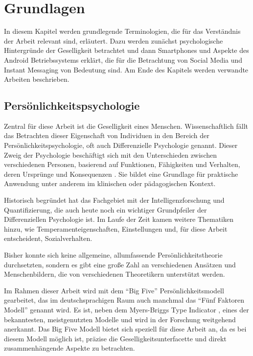 
\chapter{Grundlagen}
\label{ch:Grundlagen}

In diesem Kapitel werden grundlegende Terminologien, die für das Verständnis der Arbeit relevant sind, erläutert.
Dazu werden zunächst psychologische Hintergründe der Geselligkeit betrachtet und
dann Smartphones und Aspekte des Android Betriebssystems erklärt, die für die Betrachtung von Social Media und Instant Messaging von Bedeutung sind.
Am Ende des Kapitels werden verwandte Arbeiten beschrieben.

\section{Persönlichkeitspsychologie}
\label{ch:Grundlagen:sec:Abschnitt1}

Zentral für diese Arbeit ist die Geselligkeit eines Menschen.
Wissenschaftlich fällt das Betrachten dieser Eigenschaft von Individuen in den Bereich der Persönlichkeitspsychologie,
oft auch Differenzielle Psychologie genannt. 
Dieser Zweig der Psychologie beschäftigt sich mit den Unterschieden zwischen verschiedenen Personen, 
basierend auf Funktionen, Fähigkeiten und Verhalten, deren Ursprünge und Konsequenzen \cite{amelang2006differentielle}.
Sie bildet eine Grundlage für praktische Anwendung unter anderem im klinischen oder pädagogischen Kontext.
\par

Historisch begründet hat das Fachgebiet mit der Intelligenzforschung und Quantifizierung, 
die auch heute noch ein wichtiger Grundpfeiler der Differenziellen Psychologie ist.
Im Laufe der Zeit kamen weitere Thematiken hinzu, wie Temperamenteigenschaften, Einstellungen und, für diese Arbeit entscheident, Sozialverhalten.
\par

Bisher konnte sich keine allgemeine, allumfassende Persönlichkeitstheorie durchsetzten, sondern es gibt eine große Zahl an verschiedenen Ansätzen und Menschenbildern, die von verschiedenen Theoretikern unterstützt werden.
Im Rahmen dieser Arbeit wird mit dem "`Big Five"' Persönlichkeitsmodell gearbeitet, das im deutschsprachigen Raum auch manchmal das "`Fünf Faktoren Modell"' genannt wird.
Es ist, neben dem Myers-Briggs Type Indicator \cite{briggs1980gifts}, eines der bekanntesten, meistgenutzten Modelle und wird in der Forschung weitgehend anerkannt.
Das Big Five Modell bietet sich speziell für diese Arbeit an, da es bei diesem Modell möglich ist, präzise die Geselligkeitsunterfacette und direkt zusammenhängende Aspekte zu betrachten.

